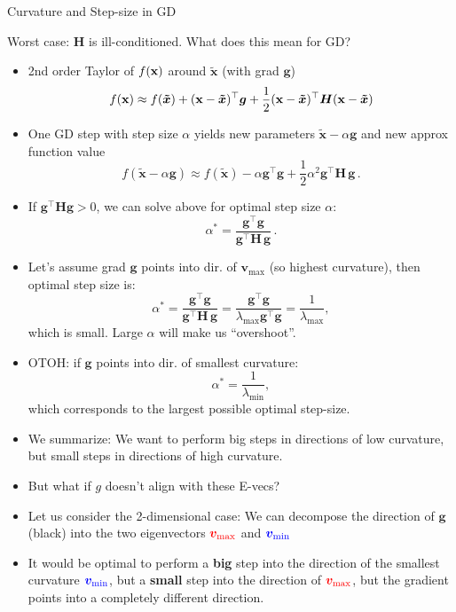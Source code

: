 \documentclass[11pt,compress,t,notes=noshow, xcolor=table]{beamer}
\begin{document}
\begin{vbframe}{Curvature and Step-size in GD}
	
	Worst case:  $\bm{H}$  is ill-conditioned. What does this mean for GD?

	\begin{itemize}
		\item 2nd order Taylor of $f(\mathbf{x})$ around $\bm{\tilde{x}}$ (with grad $\mathbf{g}$)
		$$
		f(\mathbf{x}) \approx f(\bm{\tilde{x}}) + (\mathbf{x}-\bm{\tilde{x}})^\top \bm{g} +
		\frac 12(\mathbf{x}-\bm{\tilde{x}})^\top \bm{H}(\mathbf{x}-\bm{\tilde{x}})
		$$
		\item One GD step with step size $\alpha$ yields new parameters $\bm{\tilde{x}}-\alpha \mathbf{g}$ and new approx function value
		$$
		f(\bm{\tilde{x}}-\alpha \mathbf{g}) \approx f(\bm{\tilde{x}}) - \alpha \mathbf{g}^\top\mathbf{g} + \frac{1}{2}	\alpha^2 \mathbf{g}^\top\!\bm{H}\,\mathbf{g}  \,.
		$$ 

		\item If $\mathbf{g}^\top \bm{H} \mathbf{g} > 0$, we can solve above for optimal step size $\alpha$:
		$$
		\alpha^* = \frac{\mathbf{g}^\top \mathbf{g}}{\mathbf{g}^\top \!\bm{H}\, \mathbf{g}}  \,.
		$$

		\framebreak 
		
		\item Let's assume grad $\mathbf{g}$ points into dir. of $\bm{v}_{\text{max}}$ (so highest curvature), then optimal step size is:
		$$
		\alpha^* = \frac{\mathbf{g}^\top \mathbf{g}}{\mathbf{g}^\top \!\bm{H}\, \mathbf{g}} = \frac{\mathbf{g}^\top \mathbf{g}}{\lambda_{\text{max}} \mathbf{g}^\top   \mathbf{g}} = \frac{1}{\lambda_{\text{max}}}, 
		$$ 
		which is small. Large $\alpha$ will make us \enquote{overshoot}.
		\item OTOH: if $\mathbf{g}$ points into dir. of smallest curvature:
		$$
		\alpha^* = \frac{1}{\lambda_{\text{min}}}, 
		$$
		which corresponds to the largest possible optimal step-size.
		\item We summarize: We want to perform big steps in directions of low curvature, but small steps in directions of high curvature.

		
		\framebreak 
		
		\item But what if $g$ doesn't align with these E-vecs?
		\item Let us consider the 2-dimensional case: We can decompose the direction of $\bm{g}$ (black) into the two eigenvectors $\textcolor{red}{\bm{v}_{\text{max}}}$ and $\textcolor{blue}{\bm{v}_{\text{min}}}$
		\item It would be optimal to perform a \textbf{big} step into the direction of the smallest curvature $\textcolor{blue}{\bm{v}_{\text{min}}}$, but a \textbf{small} step into the direction of $\textcolor{red}{\bm{v}_{\text{max}}}$, but the gradient points into a completely different direction. 
	\end{itemize}
	

\end{vbframe}
\end{document}
